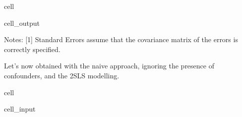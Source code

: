 \documentclass[letterpaper,10pt,english]{jupyterBook}
\begin{document}
\begin{sphinxuseclass}{cell}
\begin{sphinxVerbatimOutput}
\begin{sphinxuseclass}{cell_output}
\begin{sphinxVerbatim}[commandchars=\\\{\}]
Notes:
[1] Standard Errors assume that the covariance matrix of the errors is correctly specified.
\end{sphinxVerbatim}

\end{sphinxuseclass}\end{sphinxVerbatimOutput}

\end{sphinxuseclass}
\sphinxAtStartPar
Let’s now  obtained with the naive approach, ignoring the presence of confounders, and the 2SLS modelling.

\begin{sphinxuseclass}{cell}\begin{sphinxVerbatimInput}

\begin{sphinxuseclass}{cell_input}
\begin{sphinxVerbatim}[commandchars=\\\{\}]
  \PYG{p}{[}\PYG{p}{]}
  \PYG{p}{[}\PYG{p}{]}
  \PYG{p}{[}\PYG{p}{]}
  \PYG{p}{[}\PYG{p}{]}

  \PYG{p}{[} \PYG{p}{]}
  \PYG{p}{[} \PYG{p}{]}
  \PYG{p}{[} \PYG{p}{]}


\end{sphinxVerbatim}
\end{sphinxuseclass}
\end{sphinxVerbatimInput}
\end{sphinxuseclass}
\end{document}
